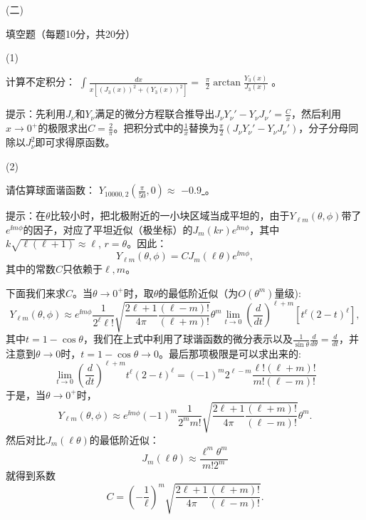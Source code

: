 \documentclass[12pt,CJK]{article}
\begin{document}
\item[(二)]{填空题（每题10分，共20分）
  \bitem
\item[(1)]{计算不定积分： $\int \frac{dx}{x\left[\left(J_3(x)\right)^2+\left(Y_3(x)\right)^2\right]} =  $ \underline{\blue $\frac{\pi}{2}\arctan{\frac{Y_3(x)}{J_3(x)}}$} 。

  {\red 提示：先利用$J_\nu$和$Y_\nu$满足的微分方程联合推导出$ J_\nu Y_\nu'-Y_\nu J_\nu'  = \frac{C}{x}$，然后利用$x\rightarrow 0^+$的极限求出$C = \frac{2}{\pi}$。把积分式中的$\frac{1}{x}$替换为$\frac{\pi}{2}\left(J_\nu Y_\nu'-Y_\nu J_\nu'\right)$，分子分母同除以$J_\nu^2$即可求得原函数。}
}
  \item[(2)]{请估算球面谐函数： $Y_{10000,2}\left(\frac{\pi}{50}, 0\right)\approx $ \underline{\blue $-0.9$ } 。

    {\red 提示：在$\theta$比较小时，把北极附近的一小块区域当成平坦的，由于$Y_{\ell m}(\theta,\phi)$带了$e^{\ii m\phi}$的因子，对应了平坦近似（极坐标）的$J_m(kr)e^{\ii m\phi}$，其中$k\sqrt{\ell(\ell+1)}\approx \ell$, $r=\theta$。因此：
      $$Y_{\ell m}(\theta,\phi) = C J_m(\ell \theta)e^{\ii m\phi},$$
      其中的常数$C$只依赖于$\ell,m$。

      下面我们来求$C$。当$\theta\rightarrow 0^+$时，取$\theta$的最低阶近似（为$O(\theta^m)$量级):
      $$ Y_{\ell m}(\theta,\phi) \approx e^{\ii m\phi} \frac{1}{2^\ell \ell!}\sqrt{ \frac{2\ell+1}{4\pi} \frac{(\ell-m)!}{(\ell+m)!}} \theta^m \lim_{t \rightarrow 0}\left(\frac{d}{dt}\right)^{\ell+m}\left[t^\ell (2-t)^\ell \right] , $$
        其中$t =1 -\cos\theta  $，我们在上式中利用了球谐函数的微分表示以及$\frac{1}{\sin\theta}\frac{d}{d\theta} = \frac{d}{dt}$，并注意到$\theta\rightarrow 0$时，$t=1-\cos\theta\rightarrow 0$。最后那项极限是可以求出来的:
        $$ \lim_{t \rightarrow 0}\left(\frac{d}{dt}\right)^{\ell+m}t^\ell (2-t)^\ell = (-1)^m 2^{\ell -m}\frac{\ell!(\ell+m)!}{m!(\ell-m)!} $$
        于是，当$\theta\rightarrow 0^+$时，
        $$ Y_{\ell m}(\theta,\phi)\approx e^{\ii m\phi} (-1)^m\frac{1}{ 2^mm!}\sqrt{ \frac{2\ell+1}{4\pi} \frac{(\ell+m)!}{(\ell-m)!}} \theta^m .$$
        然后对比$J_m(\ell\theta)$的最低阶近似：
        $$J_m(\ell\theta)\approx \frac{\ell^m\theta^m}{m!2^m} $$
        就得到系数
        $$ C = \left(-\frac{1}{\ell}\right)^m \sqrt{\frac{2\ell+1}{4\pi}\frac{(\ell+m)!}{(\ell-m)!}}. $$
    }

  }
    
  \eitem
}
  
\end{document}
